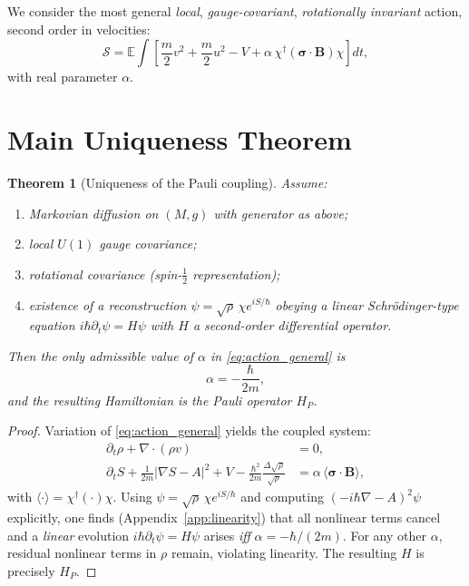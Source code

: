 \documentclass[11pt]{article}
\newtheorem{theorem}{Theorem}[section]
\begin{document}
We consider the most general \emph{local}, \emph{gauge-covariant}, \emph{rotationally invariant} action, second order in velocities:
\begin{equation}\label{eq:action_general}
\mathcal{S}=\mathbb{E}\int\!\left[\frac{m}{2}v^2+\frac{m}{2}u^2 - V
+ \alpha\, \chi^\dagger(\bm{\sigma}\cdot\bm{B})\chi \right]dt,
\end{equation}
with real parameter $\alpha$.

\section{Main Uniqueness Theorem}

\begin{theorem}[Uniqueness of the Pauli coupling]\label{thm:main}
Assume:
\begin{enumerate}
\item Markovian diffusion on $(M,g)$ with generator as above;
\item local $U(1)$ gauge covariance;
\item rotational covariance (spin-$\tfrac12$ representation);
\item existence of a reconstruction $\psi=\sqrt{\rho}\,\chi e^{iS/\hbar}$ obeying a \emph{linear} Schr\"odinger-type equation $i\hbar\partial_t\psi=H\psi$ with $H$ a second-order differential operator.
\end{enumerate}
Then the only admissible value of $\alpha$ in \eqref{eq:action_general} is
\[
\alpha=-\frac{\hbar}{2m},
\]
and the resulting Hamiltonian is the Pauli operator $H_P$.
\end{theorem}

\begin{proof}
Variation of \eqref{eq:action_general} yields the coupled system:
\begin{align}
\partial_t\rho+\nabla\cdot(\rho v)&=0,\label{eq:cont}\\
\partial_t S + \frac{1}{2m}|\nabla S - A|^2 + V
- \frac{\hbar^2}{2m}\frac{\Delta \sqrt{\rho}}{\sqrt{\rho}}
&= \alpha\, \langle \bm{\sigma}\cdot \bm{B}\rangle,\label{eq:HJ}
\end{align}
with $\langle \cdot \rangle = \chi^\dagger(\cdot)\chi$. Using $\psi=\sqrt{\rho}\,\chi e^{iS/\hbar}$ and computing $(-i\hbar\nabla-A)^2\psi$ explicitly, one finds (Appendix~\ref{app:linearity}) that all nonlinear terms cancel and a \emph{linear} evolution $i\hbar\partial_t\psi=H\psi$ arises \emph{iff} $\alpha=-\hbar/(2m)$. For any other $\alpha$, residual nonlinear terms in $\rho$ remain, violating linearity. The resulting $H$ is precisely $H_P$.
\end{proof}
\end{document}

